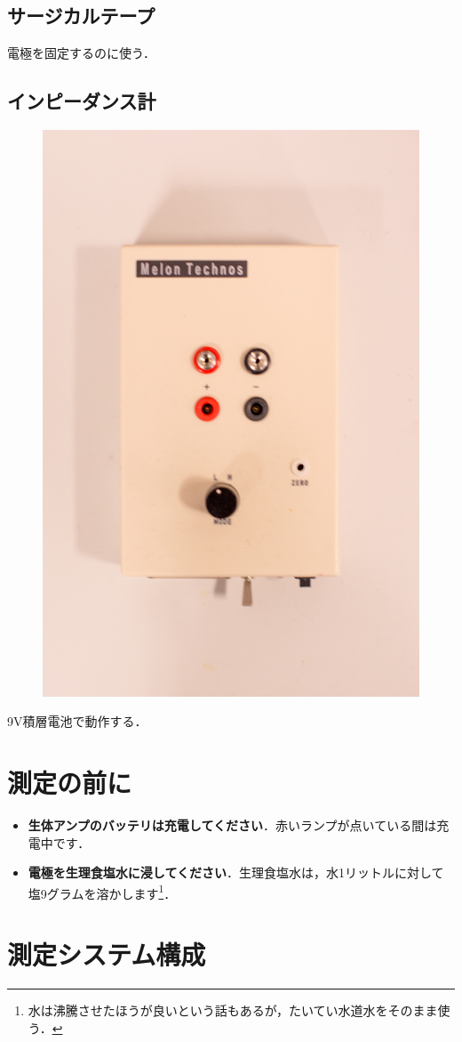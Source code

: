 \documentclass[a4j, twocolumn, openleft, uplatex, dvipdfmx]{jsbook}
\begin{document}
        \subsection*{サージカルテープ}
            電極を固定するのに使う．
        \subsection*{インピーダンス計}
            \begin{figure}[H]
                \centering
                \includegraphics[width=0.5\linewidth]{./figure/impedance.jpg}
            \end{figure}
            9V積層電池で動作する．

    \section{測定の前に}
    \label{sec:section label}
    \begin{itemize}
        \item \textbf{\gtfamily 生体アンプのバッテリは充電してください}．赤いランプが点いている間は充電中です．
        \item \textbf{\gtfamily 電極を生理食塩水に浸してください}．生理食塩水は，水1リットルに対して塩9グラムを溶かします\footnote{水は沸騰させたほうが良いという話もあるが，たいてい水道水をそのまま使う．}．
    \end{itemize}

    \section{測定システム構成}
    \label{sec:測定システム構成}
\end{document}
